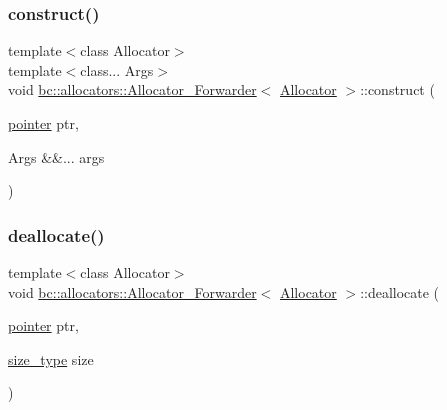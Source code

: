 \mbox{\label{structbc_1_1allocators_1_1Allocator__Forwarder_ae1f168c0dd9d8ad36dd346acbd3828ee}} 
\subsubsection{\texorpdfstring{construct()}{construct()}}
{\footnotesize\ttfamily template$<$class Allocator$>$ \\
template$<$class... Args$>$ \\
void \hyperlink{structbc_1_1allocators_1_1Allocator__Forwarder}{bc\+::allocators\+::\+Allocator\+\_\+\+Forwarder}$<$ \hyperlink{classbc_1_1allocators_1_1Allocator}{Allocator} $>$\+::construct (\begin{DoxyParamCaption}\item[{\hyperlink{structbc_1_1allocators_1_1Allocator__Forwarder_ae9d48fbeb22a6686ad59128cf309d8bd}{pointer}}]{ptr,  }\item[{Args \&\&...}]{args }\end{DoxyParamCaption})\hspace{0.3cm}{\ttfamily [inline]}}

\mbox{\label{structbc_1_1allocators_1_1Allocator__Forwarder_aefc326251206590325061d8db5b580e7}} 
\subsubsection{\texorpdfstring{deallocate()}{deallocate()}}
{\footnotesize\ttfamily template$<$class Allocator$>$ \\
void \hyperlink{structbc_1_1allocators_1_1Allocator__Forwarder}{bc\+::allocators\+::\+Allocator\+\_\+\+Forwarder}$<$ \hyperlink{classbc_1_1allocators_1_1Allocator}{Allocator} $>$\+::deallocate (\begin{DoxyParamCaption}\item[{\hyperlink{structbc_1_1allocators_1_1Allocator__Forwarder_ae9d48fbeb22a6686ad59128cf309d8bd}{pointer}}]{ptr,  }\item[{\hyperlink{structbc_1_1allocators_1_1Allocator__Forwarder_a254a9a5b0ac8837f64c107db7067e985}{size\+\_\+type}}]{size }\end{DoxyParamCaption})\hspace{0.3cm}{\ttfamily [inline]}}

